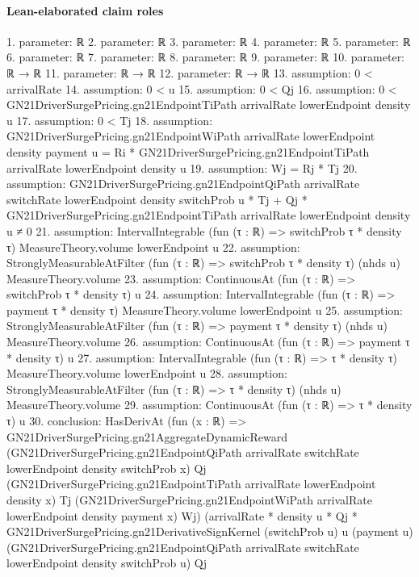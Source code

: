 \documentclass[10pt]{article}
\begin{document}
\paragraph{Lean-elaborated claim roles}\begin{ReviewVerbatim}
1. parameter: ℝ
2. parameter: ℝ
3. parameter: ℝ
4. parameter: ℝ
5. parameter: ℝ
6. parameter: ℝ
7. parameter: ℝ
8. parameter: ℝ
9. parameter: ℝ
10. parameter: ℝ → ℝ
11. parameter: ℝ → ℝ
12. parameter: ℝ → ℝ
13. assumption: 0 < arrivalRate
14. assumption: 0 < u
15. assumption: 0 < Qj
16. assumption: 0 < GN21DriverSurgePricing.gn21EndpointTiPath arrivalRate lowerEndpoint density u
17. assumption: 0 < Tj
18. assumption: GN21DriverSurgePricing.gn21EndpointWiPath arrivalRate lowerEndpoint density payment u =
  Ri * GN21DriverSurgePricing.gn21EndpointTiPath arrivalRate lowerEndpoint density u
19. assumption: Wj = Rj * Tj
20. assumption: GN21DriverSurgePricing.gn21EndpointQiPath arrivalRate switchRate lowerEndpoint density switchProb u * Tj +
    Qj * GN21DriverSurgePricing.gn21EndpointTiPath arrivalRate lowerEndpoint density u ≠
  0
21. assumption: IntervalIntegrable (fun (τ : ℝ) => switchProb τ * density τ) MeasureTheory.volume lowerEndpoint u
22. assumption: StronglyMeasurableAtFilter (fun (τ : ℝ) => switchProb τ * density τ) (nhds u) MeasureTheory.volume
23. assumption: ContinuousAt (fun (τ : ℝ) => switchProb τ * density τ) u
24. assumption: IntervalIntegrable (fun (τ : ℝ) => payment τ * density τ) MeasureTheory.volume lowerEndpoint u
25. assumption: StronglyMeasurableAtFilter (fun (τ : ℝ) => payment τ * density τ) (nhds u) MeasureTheory.volume
26. assumption: ContinuousAt (fun (τ : ℝ) => payment τ * density τ) u
27. assumption: IntervalIntegrable (fun (τ : ℝ) => τ * density τ) MeasureTheory.volume lowerEndpoint u
28. assumption: StronglyMeasurableAtFilter (fun (τ : ℝ) => τ * density τ) (nhds u) MeasureTheory.volume
29. assumption: ContinuousAt (fun (τ : ℝ) => τ * density τ) u
30. conclusion: HasDerivAt
    (fun (x : ℝ) =>
      GN21DriverSurgePricing.gn21AggregateDynamicReward
        (GN21DriverSurgePricing.gn21EndpointQiPath arrivalRate switchRate lowerEndpoint density switchProb x) Qj
        (GN21DriverSurgePricing.gn21EndpointTiPath arrivalRate lowerEndpoint density x) Tj
        (GN21DriverSurgePricing.gn21EndpointWiPath arrivalRate lowerEndpoint density payment x) Wj)
    (arrivalRate * density u * Qj *
        GN21DriverSurgePricing.gn21DerivativeSignKernel (switchProb u) u (payment u)
          (GN21DriverSurgePricing.gn21EndpointQiPath arrivalRate switchRate lowerEndpoint density switchProb u) Qj

\end{ReviewVerbatim}
\end{document}
